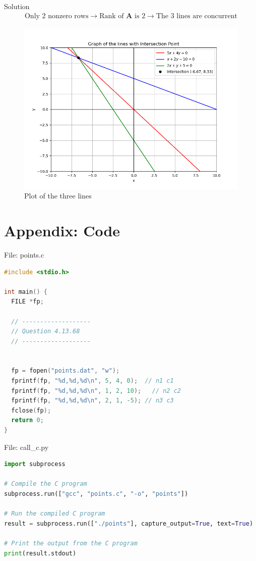 \documentclass{beamer}
\numberwithin{equation}{section}
\theoremstyle{remark}
\let\vec\mathbf
\begin{document}
\begin{frame}{Solution}
\begin{align*}
    \text{Only 2 nonzero rows}
    \longrightarrow \text{Rank of $\vec{A}$ is 2}
    \longrightarrow \text{The 3 lines are concurrent}
\end{align*}
\begin{figure}[h!]
   \centering
   \includegraphics[width=0.7\linewidth]{figs/01.png}
   \caption{Plot of the three lines}
   \label{Plot_1}
\end{figure}
\end{frame}

\section*{Appendix: Code}

\begin{frame}[fragile]{File: points.c}
\begin{lstlisting}[language=C]
#include <stdio.h>

int main() {
  FILE *fp;

  // -------------------
  // Question 4.13.68
  // -------------------


  fp = fopen("points.dat", "w");
  fprintf(fp, "%d,%d,%d\n", 5, 4, 0);  // n1 c1
  fprintf(fp, "%d,%d,%d\n", 1, 2, 10);   // n2 c2
  fprintf(fp, "%d,%d,%d\n", 2, 1, -5); // n3 c3
  fclose(fp);
  return 0;
}
\end{lstlisting}
\end{frame}

\begin{frame}[fragile]{File: call\_c.py}
\begin{lstlisting}[language=Python]
import subprocess

# Compile the C program
subprocess.run(["gcc", "points.c", "-o", "points"])

# Run the compiled C program
result = subprocess.run(["./points"], capture_output=True, text=True)

# Print the output from the C program
print(result.stdout)
\end{lstlisting}
\end{frame}
\end{document}
